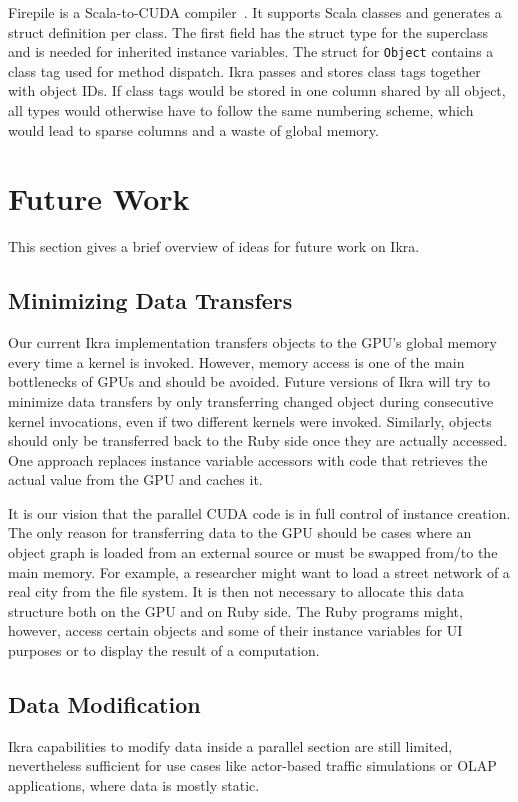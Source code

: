 \documentclass[preprint]{sigplanconf}
\begin{document}
Firepile is a Scala-to-CUDA compiler~\cite{Nystrom:2011:FRC:2047862.2047883}. It supports Scala classes and generates a struct definition per class. The first field has the struct type for the superclass and is needed for inherited instance variables. The struct for \texttt{Object} contains a class tag used for method dispatch. Ikra passes and stores class tags together with object IDs. If class tags would be stored in one column shared by all object, all types would otherwise have to follow the same numbering scheme, which would lead to sparse columns and a waste of global memory.

\section{Future Work}
This section gives a brief overview of ideas for future work on Ikra.

\subsection{Minimizing Data Transfers}
\label{sec:minimizing_dtr}
Our current Ikra implementation transfers objects to the GPU's global memory every time a kernel is invoked. However, memory access is one of the main bottlenecks of GPUs and should be avoided. Future versions of Ikra will try to minimize data transfers by only transferring changed object during consecutive kernel invocations, even if two different kernels were invoked. Similarly, objects should only be transferred back to the Ruby side once they are actually accessed. One approach replaces instance variable accessors with code that retrieves the actual value from the GPU and caches it.

It is our vision that the parallel CUDA code is in full control of instance creation. The only reason for transferring data to the GPU should be cases where an object graph is loaded from an external source or must be swapped from/to the main memory. For example, a researcher might want to load a street network of a real city from the file system. It is then not necessary to allocate this data structure both on the GPU and on Ruby side. The Ruby programs might, however, access certain objects and some of their instance variables for UI purposes or to display the result of a computation.

\subsection{Data Modification}
\label{sec:gen_new_obj}
Ikra capabilities to modify data inside a parallel section are still limited, nevertheless sufficient for use cases like actor-based traffic simulations or OLAP applications, where data is mostly static.
\end{document}

